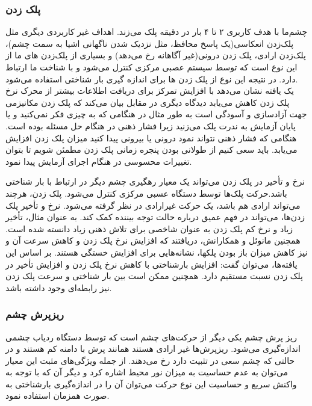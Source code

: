 \subsubsection{پلک زدن}
چشم‌ما با هدف کاربری ۲ تا ۴ بار در دقیقه پلک می‌زند. اهداف غیر کاربردی دیگری مثل پلک‌زدن انعکاسی(یک پاسخ محافظ، مثل نزدیک شدن ناگهانی اشیا به سمت چشم)،‌ پلک‌زدن ارادی، پلک زدن درونی(غیر آگاهانه رخ‌ می‌دهد) و بسیاری از پلک‌زدن های ما از این نوع است که توسط سیستم عصبی مرکزی کنترل می‌شود و با شناخت ما ارتباط دارد. در نتیجه این نوع از پلک زدن ها برای اندازه گیری بار شناختی استفاده می‌شود.
\\
یک یافته نشان می‌دهد با افزایش تمرکز برای دریافت اطلاعات بیشتر از محرک نرخ پلک زدن کاهش می‌یابد دیدگاه دیگری در مقابل بیان می‌کند که پلک زدن مکانیزمی جهت آزادسازی و آسودگی است به طور مثال در هنگامی که به چیزی فکر نمی‌کنید و یا پایان آزمایش به ندرت پلک می‌زنید زیرا فشار ذهنی در هنگام حل مسئله بوده است. هنگامی که فشار ذهنی نتواند نمود درونی یا بیرونی پیدا کنید میزان پلک زدن افزایش می‌یابد.
باید سعی کنیم از طولانی بودن پنجره زمانی پلک زدن مطمئن شویم تا بتوان تغییرات محسوسی در هنگام اجرای آزمایش پیدا نمود.
\cite{Chen2013}

نرخ و تأخير در پلک زدن 
می‌تواند یک معيار رهگيری چشم دیگر در ارتباط با بار شناختی باشد.حرکت پلک‌ها توسط دستگاه عسبی مرکزی
کنترل می‌شود.
 پلک زدن،  هرچند  می‌تواند  ارادی  هم  باشد،  یک  حركت  غيرارادی  در  نظر  گرفته  می‌شود.  نرخ  و  تأخير  پلک زدن‌ها، می‌تواند در فهم عميق درباره حالت توجه بيننده كمک كند.
\cite{zagermann2016measuring}
به عنوان مثال، تأخير زیاد و نرخ 
كم  پلک  زدن  به  عنوان  شاخصی  برای  تلاش  ذهنی  زیاد  دانسته  شده  است.
\cite{chen2011eye}
همچنين  مانوئل  و 
همکارانش، دریافتند كه افزایش نرخ پلک زدن و كاهش سرعت آن و نيز كاهش ميزان باز بودن پلکها، 
نشانه‌هایی برای افزایش خستگی هستند.
\cite{barrios2004adele}
بر اساس این یافته‌ها، می‌توان گفت: افزایش بارشناختی 
با كاهش نرخ پلک زدن و افزایش تأخير در پلک زدن نسبت مستقيم دارد. همچنين ممکن است بين بار 
شناختی و سرعت پلک زدن نيز رابطه‌ای وجود داشته باشد.
\subsubsection{ریزپرش چشم}
ریز پرش چشم
یکی دیگر از حرکت‌های چشم است که توسط دستگاه ردیاب چشمی اندازه‌گیری می‌شود. ریزپرش‌‌ها غیر ارادی هستند همانند پرش‌ با دامنه کم هستند و در حالتی که چشم سعی در تثبیت دارد رخ می‌دهند.
\cite{Krejtz2018}
از جمله ویژگی‌های مثبت این معیار می‌توان به عدم حساسیت به میزان نور محیط اشاره کرد و دیگر آن‌ که با توجه به واکنش سریع و حساسیت این نوع حرکت می‌توان آن را در اندازه‌گیری بارشناختی به صورت همزمان استفاده نمود. 

